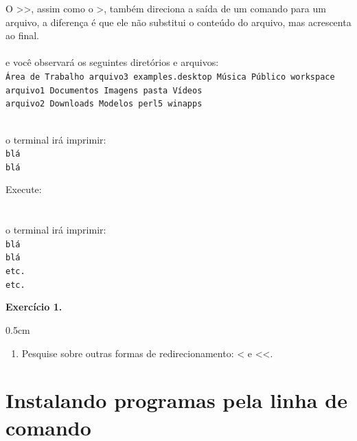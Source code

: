 \begin{refsection}
O >>, assim como o >, também direciona a saída de um comando para um arquivo, a diferença é que ele não substitui o conteúdo do arquivo, mas acrescenta ao final.\\
\\
 e você observará os seguintes diretórios e arquivos:\\
\texttt{Área de Trabalho  arquivo3    examples.desktop  Música  Público  workspace\\
arquivo1          Documentos  Imagens           pasta   Vídeos\\
arquivo2          Downloads   Modelos           perl5   winapps\\}

\\

o terminal irá imprimir:\\
\texttt{blá\\
blá\\}

Execute:\\
\\
\\

o terminal irá imprimir:\\
\texttt{blá\\
blá\\
etc.\\
etc.\\}

\begin{blackBlock}{\textbf{Exercício 1.}}\label{tut1:ex:1.\arabic{ex}}

\begin {myindentpar}{0.5cm}
\begin{enumerate}[\itshape i.]

 \item{Pesquise sobre outras formas de redirecionamento: < e <<.}

\end{enumerate}
\end{myindentpar}

\end{blackBlock}

\section{Instalando programas pela linha de comando}\label{tut1:apt_get}


\end{refsection}

